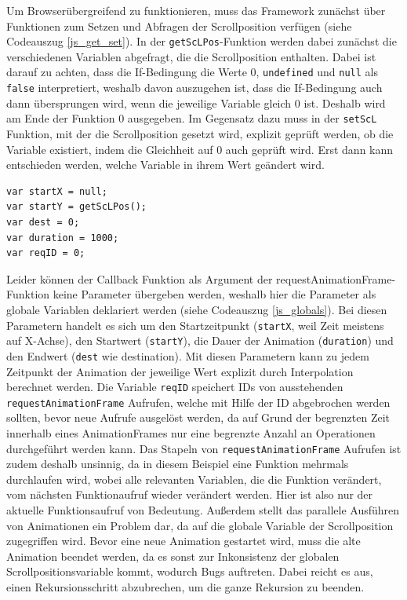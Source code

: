 Um Browserübergreifend zu funktionieren, muss das Framework zunächst über Funktionen zum Setzen und Abfragen der Scrollposition verfügen (siehe Codeauszug \ref{js_get_set}). In der \lstinline{getScLPos}-Funktion werden dabei zunächst die verschiedenen Variablen abgefragt, die die Scrollposition enthalten. Dabei ist darauf zu achten, dass die If-Bedingung die Werte 0, \lstinline{undefined} und \lstinline{null} als \lstinline{false} interpretiert, weshalb davon auszugehen ist, dass die If-Bedingung auch dann übersprungen wird, wenn die jeweilige Variable gleich 0 ist. Deshalb wird am Ende der Funktion 0 ausgegeben. Im Gegensatz dazu muss in der \lstinline{setScL} Funktion, mit der die Scrollposition gesetzt wird, explizit geprüft werden, ob die Variable existiert, indem die Gleichheit auf 0 auch geprüft wird. Erst dann kann entschieden werden, welche Variable in ihrem Wert geändert wird.

\begin{lstlisting}[caption=Globale Variablen des Animationsframework., label=js_globals]
var startX = null;
var startY = getScLPos();
var dest = 0;
var duration = 1000;
var reqID = 0;
\end{lstlisting}


Leider können der Callback Funktion als Argument der requestAnimationFrame-Funktion keine Parameter übergeben werden, weshalb hier die Parameter als globale Variablen deklariert werden (siehe Codeauszug \ref{js_globals}). Bei diesen Parametern handelt es sich um den Startzeitpunkt (\lstinline{startX}, weil Zeit meistens auf X-Achse), den Startwert (\lstinline{startY}), die Dauer der Animation (\lstinline{duration}) und den Endwert (\lstinline{dest} wie destination). Mit diesen Parametern kann zu jedem Zeitpunkt der Animation der jeweilige Wert explizit durch Interpolation berechnet werden. Die Variable \lstinline{reqID} speichert IDs von ausstehenden \lstinline{requestAnimationFrame} Aufrufen, welche mit Hilfe der ID abgebrochen werden sollten, bevor neue Aufrufe ausgelöst werden, da auf Grund der begrenzten Zeit innerhalb eines AnimationFrames nur eine begrenzte Anzahl an Operationen durchgeführt werden kann. Das Stapeln von \lstinline{requestAnimationFrame} Aufrufen ist zudem deshalb unsinnig, da in diesem Beispiel eine Funktion mehrmals durchlaufen wird, wobei alle relevanten Variablen, die die Funktion verändert, vom nächsten Funktionaufruf wieder verändert werden. Hier ist also nur der aktuelle Funktionsaufruf von Bedeutung. Außerdem stellt das parallele Ausführen von Animationen ein Problem dar, da auf die globale Variable der Scrollposition zugegriffen wird. Bevor eine neue Animation gestartet wird, muss die alte Animation beendet werden, da es sonst zur Inkonsistenz der globalen Scrollpositionsvariable kommt, wodurch Bugs auftreten. Dabei reicht es aus, einen Rekursionsschritt abzubrechen, um die ganze Rekursion zu beenden.

